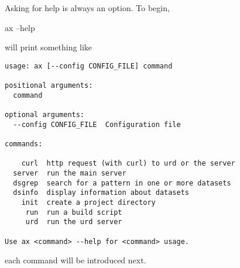 Asking for help is always an option.  To begin,
\begin{shell}
  ax --help
\end{shell}
will print something like
\begin{snugshade}
\begin{verbatim}
usage: ax [--config CONFIG_FILE] command

positional arguments:
  command

optional arguments:
  --config CONFIG_FILE  Configuration file

commands:

    curl  http request (with curl) to urd or the server
  server  run the main server
  dsgrep  search for a pattern in one or more datasets
  dsinfo  display information about datasets
    init  create a project directory
     run  run a build script
     urd  run the urd server

Use ax <command> --help for <command> usage.
\end{verbatim}
\end{snugshade}
each command will be introduced next.





